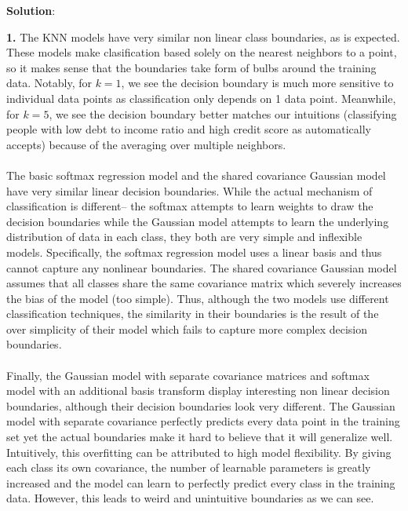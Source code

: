 \documentclass[submit]{../harvardml}
\newenvironment{solution}{
    \vspace{2mm}
    \color{black}\noindent\textbf{Solution}:
}{}
\begin{document}
\begin{solution}
    \begin{tcolorbox}
        \textbf{1.} The KNN models have very similar non linear class boundaries, as is expected. These models make clasification based solely on the nearest neighbors to a point, so it makes sense that the boundaries take form of bulbs around the training data. Notably, for $k = 1$, we see the decision boundary is much more sensitive to individual data points as classification only depends on 1 data point. Meanwhile, for $k=5$, we see the decision boundary better matches our intuitions (classifying people with low debt to income ratio and high credit score as automatically accepts) because of the averaging over multiple neighbors.
        \\
        \\
        The basic softmax regression model and the shared covariance Gaussian model have very similar linear decision boundaries. While the actual mechanism of classification is different-- the softmax attempts to learn weights to draw the decision boundaries while the Gaussian model attempts to learn the underlying distribution of data in each class, they both are very simple and inflexible models. Specifically, the softmax regression model uses a linear basis and thus cannot capture any nonlinear boundaries. The shared covariance Gaussian model assumes that all classes share the same covariance matrix which severely increases the bias of the model (too simple). Thus, although the two models use different classification techniques, the similarity in their boundaries is the result of the over simplicity of their model which fails to capture more complex decision boundaries.
        \\
        \\
        Finally, the Gaussian model with separate covariance matrices and softmax model with an additional basis transform display interesting non linear decision boundaries, although their decision boundaries look very different. The Gaussian model with separate covariance perfectly predicts every data point in the training set yet the actual boundaries make it hard to believe that it will generalize well. Intuitively, this overfitting can be attributed to high model flexibility. By giving each class its own covariance, the number of learnable parameters is greatly increased and the model can learn to perfectly predict every class in the training data. However, this leads to weird and unintuitive boundaries as we can see. 
        \\
        \\

\end{tcolorbox}
\end{solution}
\end{document}
